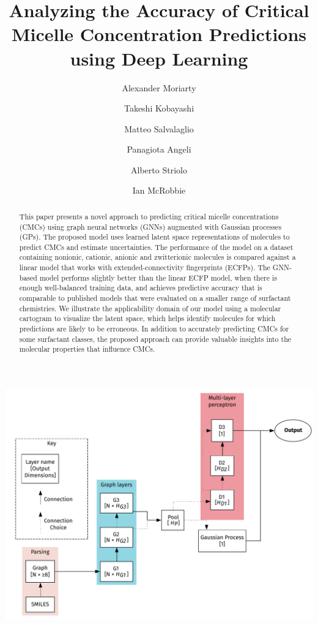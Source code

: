 \documentclass[journal=jctcce,manuscript=article]{achemso}
\author{Alexander Moriarty}
\author{Takeshi Kobayashi}
\author{Matteo Salvalaglio}
\author{Panagiota Angeli}
\author{Alberto Striolo}
\affiliation[UCL]{Department of Chemical Engineering, University College London, UK}
\author{Ian McRobbie}
\affiliation[Innospec]{Innospec Ltd., Ellesmere Port, UK}
\title{Analyzing the Accuracy of Critical Micelle Concentration Predictions using Deep Learning}
\begin{document}
\begin{tocentry}
    \includegraphics[width=\textwidth]{images/model_graph.pdf}
\end{tocentry}

\begin{abstract}
    This paper presents a novel approach to predicting critical micelle
    concentrations (CMCs) using graph neural networks (GNNs) augmented with
    Gaussian processes (GPs). The proposed model uses learned latent space
    representations of molecules to predict CMCs and estimate uncertainties. The
    performance of the model on a dataset containing nonionic, cationic, anionic
    and zwitterionic molecules is compared against a linear model that works
    with extended-connectivity fingerprints (ECFPs). The GNN-based model
    performs slightly better than the linear ECFP model, when there is enough
    well-balanced training data, and achieves predictive accuracy that is
    comparable to published models that were evaluated on a smaller range of
    surfactant chemistries. We illustrate the applicability domain of our model
    using a molecular cartogram to visualize the latent space, which helps
    identify molecules for which predictions are likely to be erroneous. In
    addition to accurately predicting CMCs for some surfactant classes, the
    proposed approach can provide valuable insights into the molecular
    properties that influence CMCs.
\end{abstract}
\end{document}
